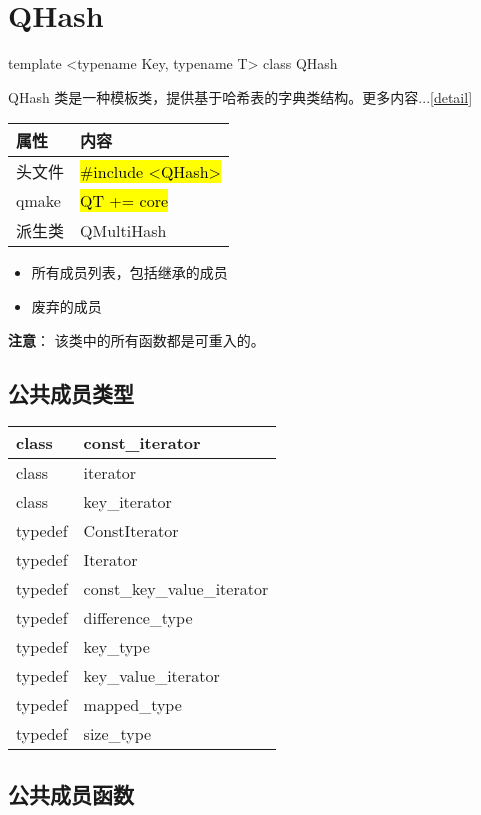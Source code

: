 \chapter{QHash}\label{hash}

template <typename Key, typename T> class QHash

QHash 类是一种模板类，提供基于哈希表的字典类结构。更多内容...\ref{detail}


\begin{tabular}{|l|l|}
\hline
属性& 	内容\\
\hline
头文件& 	\hl{\#include <QHash>}\\
\hline
qmake& 	\hl{QT += core}\\
\hline
派生类& 	QMultiHash\\
\hline
\end{tabular}


\begin{itemize}
\item 所有成员列表，包括继承的成员
\item 废弃的成员
\end{itemize}

\textbf{注意}： 该类中的所有函数都是可重入的。

\splitLine

\section{公共成员类型}

\begin{tabular}{|m{5em}|m{30em}|}
\hline
class& 	const\_iterator\\
\hline
class& 	iterator\\
\hline
class& 	key\_iterator\\
\hline
typedef& 	ConstIterator\\
\hline
typedef& 	Iterator\\
\hline
typedef& 	const\_key\_value\_iterator\\
\hline
typedef& 	difference\_type\\
\hline
typedef& 	key\_type\\
\hline
typedef& 	key\_value\_iterator\\
\hline
typedef& 	mapped\_type\\
\hline
typedef& 	size\_type\\
\hline
\end{tabular}

\splitLine

\section{公共成员函数}

